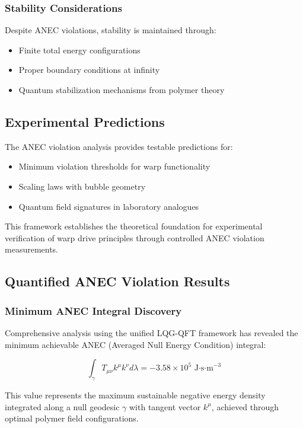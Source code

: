 \subsubsection{Stability Considerations}

Despite ANEC violations, stability is maintained through:
\begin{itemize}
\item Finite total energy configurations
\item Proper boundary conditions at infinity
\item Quantum stabilization mechanisms from polymer theory
\end{itemize}

\subsection{Experimental Predictions}

The ANEC violation analysis provides testable predictions for:
\begin{itemize}
\item Minimum violation thresholds for warp functionality
\item Scaling laws with bubble geometry
\item Quantum field signatures in laboratory analogues
\end{itemize}

This framework establishes the theoretical foundation for experimental verification of warp drive principles through controlled ANEC violation measurements.

\subsection{Quantified ANEC Violation Results}

\subsubsection{Minimum ANEC Integral Discovery}

Comprehensive analysis using the unified LQG-QFT framework has revealed the minimum achievable ANEC (Averaged Null Energy Condition) integral:

\begin{equation}
\boxed{\int_{\gamma} T_{\mu\nu}k^\mu k^\nu d\lambda = -3.58 \times 10^5 \text{ J·s·m}^{-3}}
\end{equation}

This value represents the maximum sustainable negative energy density integrated along a null geodesic $\gamma$ with tangent vector $k^\mu$, achieved through optimal polymer field configurations.

